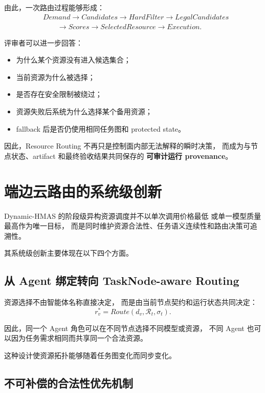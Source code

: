 \documentclass[UTF8,a4paper,12pt,oneside]{ctexbook}
\begin{document}
由此，一次路由过程能够形成：
\[
\begin{aligned}
&Demand \rightarrow Candidates \rightarrow HardFilter
\rightarrow LegalCandidates \\[3pt]
&\qquad\rightarrow Scores \rightarrow SelectedResource
\rightarrow Execution.
\end{aligned}
\]

评审者可以进一步回答：

\begin{itemize}
    \item 为什么某个资源没有进入候选集合；
    \item 当前资源为什么被选择；
    \item 是否存在安全限制被绕过；
    \item 资源失败后系统为什么选择某个备用资源；
    \item fallback 后是否仍使用相同任务图和 protected state。
\end{itemize}

因此，Resource Routing 不再只是控制面内部无法解释的瞬时决策，
而成为与节点状态、artifact 和最终验收结果共同保存的
\textbf{可审计运行 provenance}。


\section{端边云路由的系统级创新}

Dynamic-HMAS 的阶段级异构资源调度并不以单次调用价格最低
或单一模型质量最高作为唯一目标，
而是同时维护资源合法性、任务语义连续性和路由决策可追溯性。

其系统级创新主要体现在以下四个方面。

\subsection{从 Agent 绑定转向 TaskNode-aware Routing}

资源选择不由智能体名称直接决定，
而是由当前节点契约和运行状态共同决定：
\[
r_v^{*}
=
Route(d_v,\mathcal{R}_t,\sigma_t).
\]

因此，同一个 Agent 角色可以在不同节点选择不同模型或资源，
不同 Agent 也可以因为任务需求相同而共享同一个合法资源。

这种设计使资源拓扑能够随着任务图变化而同步变化。


\subsection{不可补偿的合法性优先机制}
\end{document}
